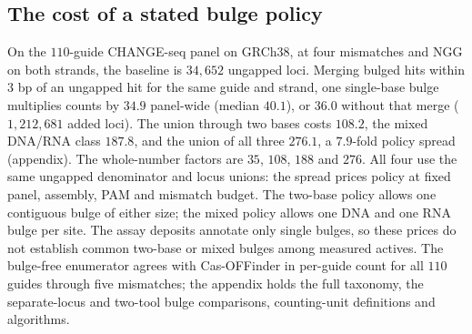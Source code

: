 \subsection{The cost of a stated bulge policy}
\label{ssec:bulge-cost}
On the $110$-guide CHANGE-seq panel on GRCh38, at four mismatches and NGG on both strands,
the baseline is $34{,}652$ ungapped loci. Merging bulged hits within $3$ bp of an ungapped
hit for the same guide and strand, one single-base bulge multiplies counts by $34.9$
panel-wide (median $40.1$), or $36.0$ without that merge ($1{,}212{,}681$ added
loci). The union through two bases costs $108.2$, the mixed DNA/RNA
class $187.8$, and the union of all three $276.1$, a $7.9$-fold policy spread (appendix).
The whole-number factors are $35$, $108$, $188$ and $276$. All four use the same
ungapped denominator and locus unions: the spread prices policy at fixed panel,
assembly, PAM and mismatch budget. The two-base policy allows one contiguous
bulge of either size; the mixed policy allows one DNA and one RNA bulge per site.
The assay deposits annotate only single bulges, so these prices do not establish
common two-base or mixed bulges among measured actives.
The bulge-free enumerator agrees with Cas-OFFinder \citep{bae2014casoffinder} in per-guide
count for all $110$ guides through five mismatches; the appendix holds the full taxonomy,
the separate-locus and two-tool bulge comparisons, counting-unit definitions and algorithms.

